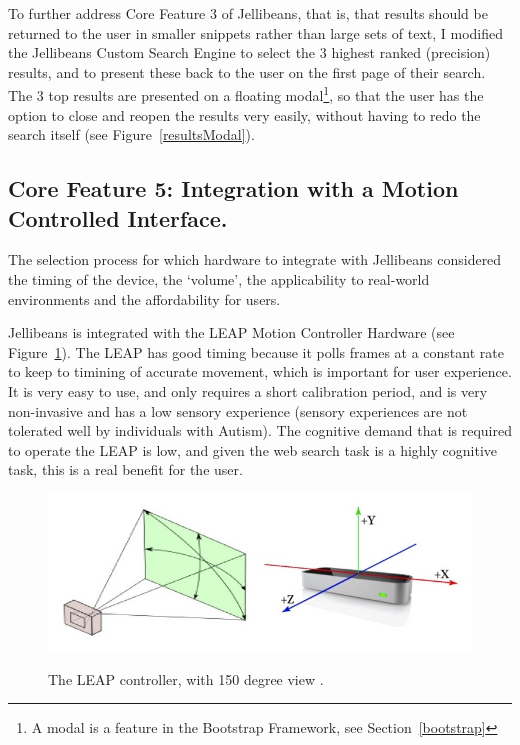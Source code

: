 \documentclass[a4paper, 11pt]{article}
\begin{document}
\vspace{5mm} %
To further address Core Feature 3 of Jellibeans, that is, that results should be returned to the user in smaller snippets rather than large sets of text, I modified the Jellibeans Custom Search Engine to select the 3 highest ranked (precision) results, and to present these back to the user on the first page of their search. The 3 top results are presented on a floating modal\footnote{A modal is a feature in the Bootstrap Framework, see Section~\ref{bootstrap}}, so that the user has the option to close and reopen the results very easily, without having to redo the search itself (see Figure~\ref{resultsModal}).


\subsection{Core Feature 5: Integration with a Motion Controlled Interface.}

The selection process for which hardware to integrate with Jellibeans considered the timing of the device, the `volume', the applicability to real-world environments and the affordability for users.

\vspace{5mm}
Jellibeans is integrated with the LEAP Motion Controller Hardware (see Figure~\ref{leap}). The LEAP has good timing because it polls frames at a constant rate to keep to timining of accurate movement, which is important for user experience. It is very easy to use, and only requires a short calibration period, and is very non-invasive and has a low sensory experience (sensory experiences are not tolerated well by individuals with Autism). The cognitive demand that is required to operate the LEAP is low, and given the web search task is a highly cognitive task, this is a real benefit for the user.

\begin{figure}[H]
\begin{center}
\includegraphics[scale=0.4]{leap}\\
\caption{The LEAP controller, with 150 degree view \cite{leap}.}
\label{leap}
\end{center}
\end{figure}
\end{document}
